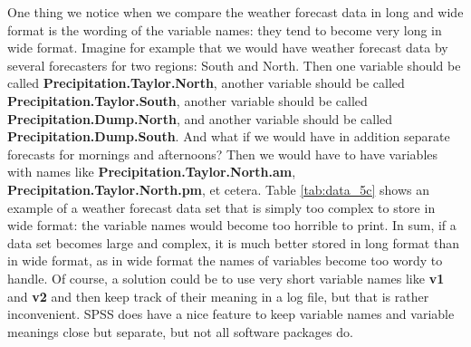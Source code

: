 \begin{kframe}


{\ttfamily\noindent\bfseries{}}

{\ttfamily\noindent\bfseries{}}

{\ttfamily\noindent\bfseries\color{errorcolor}{\#\# Error in eval(expr, envir, enclos): object 'sunshine' not found}}

{\ttfamily\noindent\bfseries\color{errorcolor}{\#\# Error in eval(expr, envir, enclos): object 'precipitation' not found}}

{\ttfamily\noindent\bfseries{}}

{\ttfamily\noindent\bfseries{}}

{\ttfamily\noindent\bfseries{}}\end{kframe}


One thing we notice when we compare the weather forecast data in long and wide format is the wording of the variable names: they tend to become very long in wide format. Imagine for example that we would have weather forecast data by several forecasters for two regions: South and North. Then one variable should be called \textbf{Precipitation.Taylor.North}, another variable should be called \textbf{Precipitation.Taylor.South}, another variable should be called \textbf{Precipitation.Dump.North}, and another variable should be called \textbf{Precipitation.Dump.South}. And what if we would have in addition separate forecasts for mornings and afternoons? Then we would have to have variables with names like \textbf{Precipitation.Taylor.North.am}, \textbf{Precipitation.Taylor.North.pm}, et cetera. Table \ref{tab:data_5c} shows an example of a weather forecast data set that is simply too complex to store in wide format: the variable names would become too horrible to print. In sum, if a data set becomes large and complex, it is much better stored in long format than in wide format, as in wide format the names of variables become too wordy to handle. Of course, a solution could be to use very short variable names like \textbf{v1} and \textbf{v2} and then keep track of their meaning in a log file, but that is rather inconvenient. SPSS does have a nice feature to keep variable names and variable meanings close but separate, but not all software packages do.

